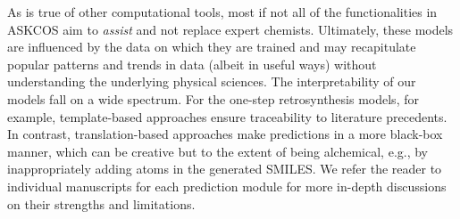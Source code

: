 \documentclass[pdflatex,sn-mathphys-num]{sn-jnl}%
\theoremstyle{thmstyleone}%
\theoremstyle{thmstyletwo}%
\theoremstyle{thmstylethree}%
\begin{document}

As is true of other computational tools, most if not all of the functionalities in ASKCOS aim to \emph{assist} and not replace expert chemists. Ultimately, these models are influenced by the data on which they are trained and may recapitulate popular patterns and trends in data (albeit in useful ways) without understanding the underlying physical sciences. The interpretability of our models fall on a wide spectrum. For the one-step retrosynthesis models, for example, template-based approaches ensure traceability to literature precedents. In contrast, translation-based approaches make predictions in a more black-box manner, which can be creative but to the extent of being alchemical, e.g., by inappropriately adding atoms in the generated SMILES. We refer the reader to individual manuscripts for each prediction module for more in-depth discussions on their strengths and limitations. 
\end{document}
